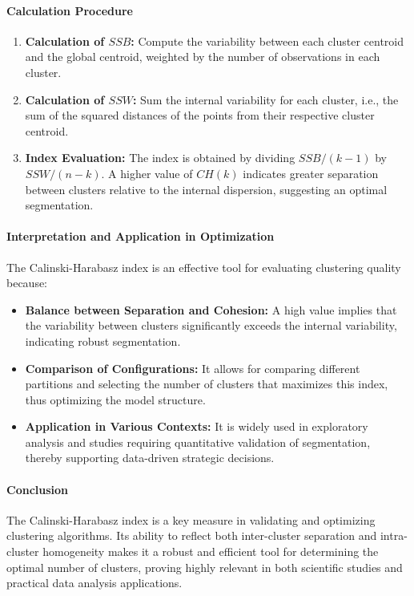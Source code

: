 \documentclass[10pt]{article}
\begin{document}
\paragraph{Calculation Procedure}
\begin{enumerate}
    \item \textbf{Calculation of $SSB$:} Compute the variability between each cluster centroid and the global centroid, weighted by the number of observations in each cluster.
    \item \textbf{Calculation of $SSW$:} Sum the internal variability for each cluster, i.e., the sum of the squared distances of the points from their respective cluster centroid.
    \item \textbf{Index Evaluation:} The index is obtained by dividing $SSB/(k-1)$ by $SSW/(n-k)$. A higher value of $CH(k)$ indicates greater separation between clusters relative to the internal dispersion, suggesting an optimal segmentation.
\end{enumerate}

\paragraph{Interpretation and Application in Optimization}
The Calinski-Harabasz index is an effective tool for evaluating clustering quality because:
\begin{itemize}
    \item \textbf{Balance between Separation and Cohesion:} A high value implies that the variability between clusters significantly exceeds the internal variability, indicating robust segmentation.
    \item \textbf{Comparison of Configurations:} It allows for comparing different partitions and selecting the number of clusters that maximizes this index, thus optimizing the model structure.
    \item \textbf{Application in Various Contexts:} It is widely used in exploratory analysis and studies requiring quantitative validation of segmentation, thereby supporting data-driven strategic decisions.
\end{itemize}

\paragraph{Conclusion}  
The Calinski-Harabasz index is a key measure in validating and optimizing clustering algorithms. Its ability to reflect both inter-cluster separation and intra-cluster homogeneity makes it a robust and efficient tool for determining the optimal number of clusters, proving highly relevant in both scientific studies and practical data analysis applications.
\end{document}
